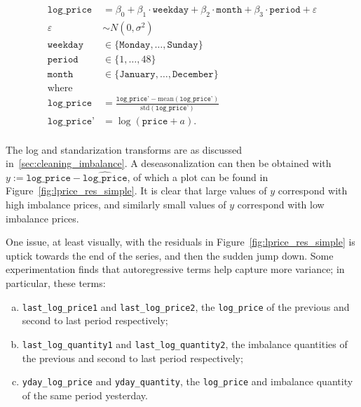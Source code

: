\documentclass[11pt,twoside,openany]{book}
\newcommand{\eps}{\varepsilon}
\newcommand{\code}[1]{\texttt{#1}}
\numberwithin{Theorem}{chapter}
\numberwithin{Definition}{chapter}
\numberwithin{Lemma}{chapter}
\numberwithin{Algorithm}{chapter}
\numberwithin{equation}{chapter}
\begin{document}
\begin{equation}\label{eq:seasonal_imbalance_price_factor}
  \begin{split}
    \code{log_price} &= \beta_0 + \beta_1 \cdot \code{weekday} + \beta_2 \cdot \code{month} + \beta_3 \cdot \code{period} + \eps\\
    \eps &\sim N(0,\sigma^2)\\
    \code{weekday}&\in \{\code{Monday},\ldots,\code{Sunday}\}\\
    \code{period}& \in \{1,\ldots,48\}\\
    \code{month}& \in \{\code{January},\ldots,\code{December}\}\\
    \text{where}&\\
    \code{log_price} &= \frac{\code{log_price'} - \text{mean}(\code{log_price'})}
    {\text{std}(\code{log_price'})}\\
    \code{log_price'} &= \log(\code{price} +a).\\
  \end{split}
\end{equation}



The log and standarization transforms are as discussed
in~\ref{sec:cleaning_imbalance}.
 A deseasonalization can then be obtained with $y :=
\code{log_price} - \widehat{\code{log_price}}$, of which a plot can be
found in Figure~\ref{fig:lprice_res_simple}. It is clear that large values of
$y$ correspond with high imbalance prices, and similarly small values
of $y$ correspond with low imbalance prices.


One issue, at least visually, with the residuals in
Figure~\ref{fig:lprice_res_simple} is uptick towards the end of the
series, and then the sudden jump down. Some experimentation finds
that autoregressive terms help capture more variance; in particular,
these terms:

\begin{enumerate}[(a)]
  \item \code{last_log_price1} and \code{last_log_price2},
    the \code{log_price} of the previous and second to last period respectively;
  \item \code{last_log_quantity1} and \code{last_log_quantity2},
    the imbalance quantities of the previous and second to last
    period respectively;
  \item \code{yday_log_price} and \code{yday_quantity}, the \code{log_price}
    and imbalance quantity of the same period yesterday.
\end{enumerate}
\end{document}
